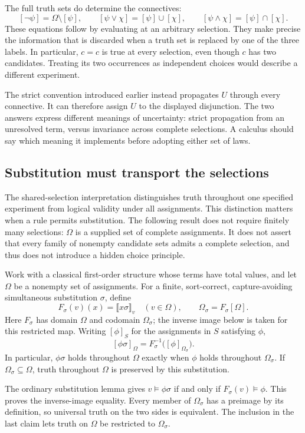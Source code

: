 The full truth sets do determine the connectives:
\[
[\neg\psi]=\Omega\setminus[\psi],\qquad
[\psi\lor\chi]=[\psi]\cup[\chi],\qquad
[\psi\land\chi]=[\psi]\cap[\chi].
\]
These equations follow by evaluating at an arbitrary selection. They make
precise the information that is discarded when a truth set is replaced by
one of the three labels. In particular, $c=c$ is true at every selection,
even though $c$ has two candidates. Treating its two occurrences as
independent choices would describe a different experiment.

The strict convention introduced earlier instead propagates $U$ through
every connective. It can therefore assign $U$ to the displayed disjunction.
The two answers express different meanings of uncertainty: strict propagation
from an unresolved term, versus invariance across complete selections.
A calculus should say which meaning it implements before adopting either
set of laws.

\subsection{Substitution must transport the selections}
The shared-selection interpretation distinguishes truth throughout one
specified experiment from logical validity under all assignments.
This distinction matters when a rule permits substitution. The following
result does not require finitely many selections: $\Omega$ is a supplied
set of complete assignments. It does not assert that every family of
nonempty candidate sets admits a complete selection, and thus does not
introduce a hidden choice principle.

\begin{theorem}
Work with a classical first-order structure whose terms have total values,
and let $\Omega$ be a nonempty set of assignments. For a finite,
sort-correct, capture-avoiding simultaneous substitution $\sigma$, define
\[
F_\sigma(v)(x)=\llbracket x\sigma\rrbracket_v\quad(v\in\Omega),
\qquad \Omega_\sigma=F_\sigma[\Omega].
\]
Here $F_\sigma$ has domain $\Omega$ and codomain $\Omega_\sigma$;
the inverse image below is taken for this restricted map. Writing
$[\phi]_S$ for the assignments in $S$ satisfying $\phi$,
\[
[\phi\sigma]_\Omega
 =F_\sigma^{-1}\bigl([\phi]_{\Omega_\sigma}\bigr).
\]
In particular, $\phi\sigma$ holds throughout $\Omega$ exactly when
$\phi$ holds throughout $\Omega_\sigma$. If
$\Omega_\sigma\subseteq\Omega$, truth throughout $\Omega$ is preserved
by this substitution.
\end{theorem}
\Proof
The ordinary substitution lemma gives
$v\models\phi\sigma$ if and only if $F_\sigma(v)\models\phi$.
This proves the inverse-image equality. Every member of $\Omega_\sigma$
has a preimage by its definition, so universal truth on the two sides is
equivalent. The inclusion in the last claim lets truth on $\Omega$ be
restricted to $\Omega_\sigma$.
\Done


